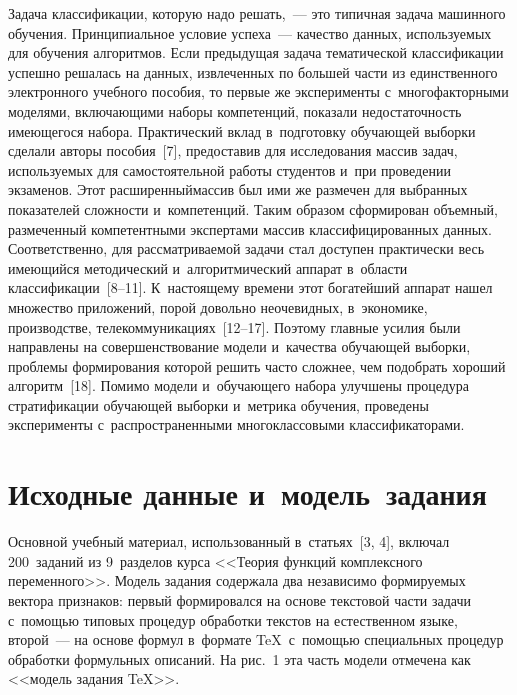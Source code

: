 \begin{multicols}{2}
     Задача классификации, которую надо решать,~--- это типичная задача 
машинного обучения. Принципиальное условие успеха~--- качество данных,\linebreak 
используемых для обучения алгоритмов. Если предыду\-щая задача 
тематической классификации успешно решалась на данных, извлеченных по 
большей части из единственного электронного учебного пособия, то первые 
же эксперименты с~многофакторными моделями, включающими наборы 
компетенций, показали недостаточность имеющегося набора. Практический 
вклад в~подготовку обуча\-ющей выборки сделали авторы пособия~[7], 
предоставив для исследования массив задач, ис\-поль\-зу\-емых для 
самостоятельной работы студентов и~при проведении экзаменов. Этот 
расширенный\linebreak массив был ими же размечен для выбранных показателей 
слож\-ности и~компетенций. Таким образом сформирован объемный, 
размеченный компетентными экспертами массив \mbox{классифицированных} 
данных. Соответственно, для рас\-смат\-ри\-ва\-емой задачи стал до\-сту\-пен 
практически весь име\-ющий\-ся методический и~алгоритмический аппарат в~об\-ласти классификации~[8--11]. К~настоящему времени этот богатейший 
аппарат нашел множество приложений, порой довольно неочевидных, 
в~экономике, производстве, телекоммуникациях~[12--17]. Поэтому главные 
усилия были направлены на совершенствование модели и~качества 
обуча\-ющей выборки, проб\-ле\-мы формирования которой решить час\-то 
слож\-нее, чем подобрать хороший алгоритм~[18]. Помимо модели  
и~обуча\-юще\-го набора улучшены процедура стратификации обуча\-ющей 
выборки и~мет\-ри\-ка обуче\-ния, проведены эксперименты 
с~распространенными многоклассовыми классификаторами.

\section{Исходные данные и~модель~задания}

      Основной учебный материал, использованный в~статьях~[3, 4], 
включал 200~заданий из 9~разделов курса <<Тео\-рия функций комплексного 
переменного>>. Модель задания содержала два независимо формируемых 
вектора признаков: первый формировался на основе текстовой части задачи 
с~по\-мощью типовых процедур обработки текстов на естественном языке, 
второй~--- на основе формул в~формате \TeX\ с~по\-мощью специальных 
процедур обработки формульных описаний. На рис.~1 эта часть модели 
отмечена как <<модель задания \TeX>>.
      

\end{multicols}
